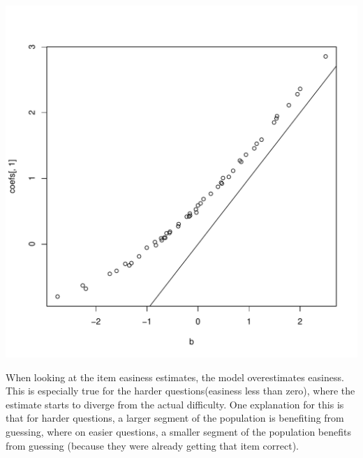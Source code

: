 \documentclass{article}\usepackage[]{graphicx}\usepackage[]{color}
\makeatletter
\def\maxwidth{ %
  \ifdim\Gin@nat@width>\linewidth
    \linewidth
  \else
    \Gin@nat@width
  \fi
}
\newenvironment{knitrout}{}{} %
\makeatother
\begin{document}
\begin{knitrout}
\color{fgcolor}
\includegraphics[width=\maxwidth]{figure/unnamed-chunk-14-1} 

\end{knitrout}

When looking at the item easiness estimates, the model overestimates easiness.  This is especially true for the harder questions(easiness less than zero), where the estimate starts to diverge from the actual difficulty.  One explanation for this is that for harder questions, a larger segment of the population is benefiting from guessing, where on easier questions, a smaller segment of the population benefits from guessing (because they were already getting that item correct).
\end{document}
